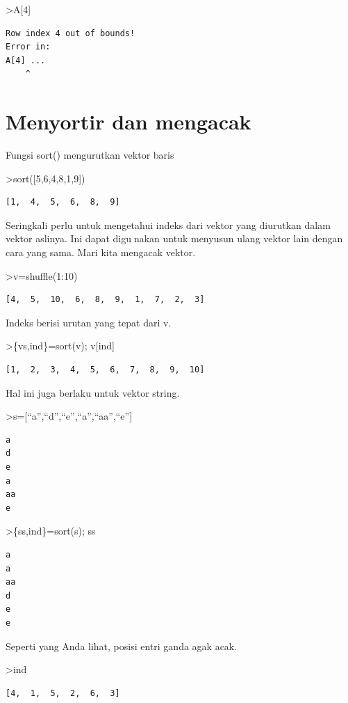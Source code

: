 \documentclass[
]{book}
\begin{document}
\textgreater A{[}4{]}

\begin{verbatim}
Row index 4 out of bounds!
Error in:
A[4] ...
    ^
\end{verbatim}

\section{Menyortir dan mengacak}\label{menyortir-dan-mengacak}

Fungsi sort() mengurutkan vektor baris

\textgreater sort({[}5,6,4,8,1,9{]})

\begin{verbatim}
[1,  4,  5,  6,  8,  9]
\end{verbatim}

Seringkali perlu untuk mengetahui indeks dari vektor yang diurutkan dalam vektor aslinya. Ini dapat digunakan untuk menyusun ulang vektor lain dengan cara yang sama. Mari kita mengacak vektor.

\textgreater v=shuffle(1:10)

\begin{verbatim}
[4,  5,  10,  6,  8,  9,  1,  7,  2,  3]
\end{verbatim}

Indeks berisi urutan yang tepat dari v.

\textgreater\{vs,ind\}=sort(v); v{[}ind{]}

\begin{verbatim}
[1,  2,  3,  4,  5,  6,  7,  8,  9,  10]
\end{verbatim}

Hal ini juga berlaku untuk vektor string.

\textgreater s={[}``a'',``d'',``e'',``a'',``aa'',``e''{]}

\begin{verbatim}
a
d
e
a
aa
e
\end{verbatim}

\textgreater\{ss,ind\}=sort(s); ss

\begin{verbatim}
a
a
aa
d
e
e
\end{verbatim}

Seperti yang Anda lihat, posisi entri ganda agak acak.

\textgreater ind

\begin{verbatim}
[4,  1,  5,  2,  6,  3]
\end{verbatim}
\end{document}
